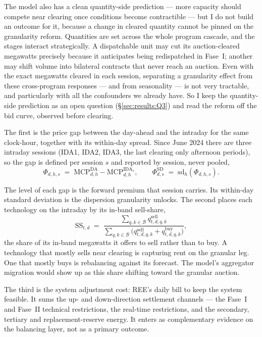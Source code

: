 \documentclass[11pt,a4paper]{article}
\theoremstyle{definition}
\theoremstyle{remark}
\theoremstyle{plain}
\begin{document}
The model also has a clean quantity-side prediction --- more capacity should compete near clearing once conditions become contractible --- but I do not build an outcome for it, because a change in cleared quantity cannot be pinned on the granularity reform. Quantities are set across the whole program cascade, and the stages interact strategically. A dispatchable unit may cut its auction-cleared megawatts precisely because it anticipates being redispatched in Fase~I; another may shift volume into bilateral contracts that never reach an auction. Even with the exact megawatts cleared in each session, separating a granularity effect from these cross-program responses --- and from seasonality --- is not very tractable, and particularly with all the confounders we already have. So I keep the quantity-side prediction as an open question (\S\ref{sec:results:Q3}) and read the reform off the bid curve, observed before clearing.

The first is the price gap between the day-ahead and the intraday for the same clock-hour, together with its within-day spread. Since June 2024 there are three intraday sessions (IDA1, IDA2, IDA3, the last clearing only afternoon periods), so the gap is defined per session $s$ and reported by session, never pooled,
\[
\Phi_{d,h,s} \;=\; \text{MCP}^{\text{DA}}_{d,h} - \text{MCP}^{\text{IDA}_s}_{d,h}, \qquad
\Phi^{\text{SD}}_{d,s} \;=\; \mathrm{sd}_h(\Phi_{d,h,s}).
\]

The level of each gap is the forward premium that session carries. Its within-day standard deviation is the dispersion granularity unlocks. The second places each technology on the intraday by its in-band sell-share,
\[
\text{SS}_{t,d} \;=\; \frac{\sum_{q,k\in\mathcal{B}} q^{\text{sell}}_{t,d,q,k}}{\sum_{q,k\in\mathcal{B}}\bigl(q^{\text{sell}}_{t,d,q,k} + q^{\text{buy}}_{t,d,q,k}\bigr)},
\]
the share of its in-band megawatts it offers to sell rather than to buy. A technology that mostly sells near clearing is capturing rent on the granular leg. One that mostly buys is rebalancing against its forecast. The model's aggregator migration would show up as this share shifting toward the granular auction.

The third is the system adjustment cost: REE's daily bill to keep the system feasible. It sums the up- and down-direction settlement channels --- the Fase~I and Fase~II technical restrictions, the real-time restrictions, and the secondary, tertiary and replacement-reserve energy. It enters as complementary evidence on the balancing layer, not as a primary outcome.
\end{document}
